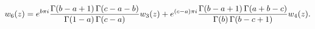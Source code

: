 \[w_{6}(z)=e^{b\pi i}\frac{\mathop{\Gamma\/}\nolimits\!\left(b-a+1\right)\mathop%
{\Gamma\/}\nolimits\!\left(c-a-b\right)}{\mathop{\Gamma\/}\nolimits\!\left(1-a%
\right)\mathop{\Gamma\/}\nolimits\!\left(c-a\right)}w_{3}(z)+e^{(c-a)\pi i}%
\frac{\mathop{\Gamma\/}\nolimits\!\left(b-a+1\right)\mathop{\Gamma\/}\nolimits%
\!\left(a+b-c\right)}{\mathop{\Gamma\/}\nolimits\!\left(b\right)\mathop{\Gamma%
\/}\nolimits\!\left(b-c+1\right)}w_{4}(z).\]